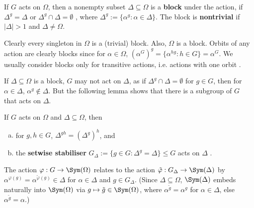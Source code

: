 \begin{definition}\label{def:block_under_action}
    If $G$ acts on $\Omega$, then a nonempty subset $\Delta \subseteq \Omega$ is a \textbf{block} under the action, if $\Delta^g = \Delta$ or $\Delta^g \cap \Delta = \emptyset$ , where $\Delta^g := \{\alpha^g : \alpha \in \Delta\}$. The block is \textbf{nontrivial} if $|\Delta| > 1$ and $\Delta \neq \Omega$.
\end{definition}

Clearly every singleton in $\Omega$ is a (trivial) block. Also, $\Omega$ is a block. Orbits of any action are clearly blocks since for $\alpha \in \Omega$, $(\alpha^G)^g = \{\alpha^{hg} : h \in G\} = \alpha^G$. We usually consider blocks only for transitive actions, i.e. actions with one orbit .

If $\Delta \subseteq \Omega$ is a block, $G$ may not act on $\Delta$, as if $\Delta^g \cap \Delta = \emptyset$ for $g \in G$, then for $\alpha \in \Delta$, $\alpha^g \not\in \Delta$. But the following lemma shows that there is a subgroup of $G$ that acts on $\Delta$.

\begin{lemma}\label{lem:restrict_action_to_block}
    If $G$ acts on $\Omega$ and $\Delta \subseteq \Omega$, then
    \begin{enumerate}[(a)]
        \item for $g,h \in G$, $\Delta^{gh} = (\Delta^g)^h$, and
        \item the \textbf{setwise stabiliser} $G_\Delta := \{g \in G : \Delta^g = \Delta\} \leq G$ acts on $\Delta$ .
    \end{enumerate}
    The action $\varphi : G \to \Sym(\Omega)$ relates to the action $\tilde\varphi : G_\Delta \to \Sym(\Delta)$ by $\alpha^{\varphi(g)} = \alpha^{\tilde\varphi(g)} \in \Delta$ for $\alpha \in \Delta$ and $g \in G_\Delta$. (Since $\Delta \subseteq \Omega$, $\Sym(\Delta)$ embeds naturally into $\Sym(\Omega)$ via $g \mapsto \tilde g \in \Sym(\Omega)$, where $\alpha^{\tilde g} = \alpha^g$ for $\alpha \in \Delta$, else $\alpha^{\tilde g} = \alpha$.)
\end{lemma}

